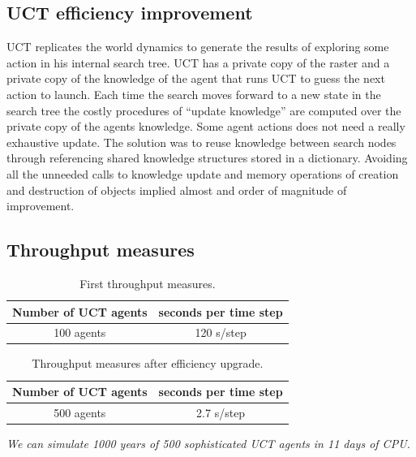 \documentclass[11pt,oneside,a4paper,openright]{report}
\begin{document}
\subsection{UCT efficiency improvement}

UCT replicates the world dynamics to generate the results of exploring some action in his internal search tree. UCT has a private copy of the raster and a private copy of the knowledge of the agent that runs UCT to guess the next action to launch.
Each time the search moves forward to a new state in the search tree the costly procedures of ``update knowledge''
are computed over the private copy of the agents knowledge. Some agent actions does not need a really exhaustive update. The solution was to reuse knowledge between search nodes through referencing shared knowledge structures stored
in a dictionary. Avoiding all the unneeded calls to knowledge update and memory operations of creation and destruction
of objects implied almost and order of magnitude of improvement.

 
\subsection{Throughput measures}



\begin{table}[ht!]
	\centering
	\begin{tabular}{|c|c|}
		\hline
		Number of UCT agents	& seconds per time step \\
		\hline
		100 agents		& 120 s/step\\
		\hline
	\end{tabular}
	\caption{First throughput measures.}
	\label{tab:secondsPerTimeStepInitial}
	\end{table}


\begin{table}[ht!]
	\centering
	\begin{tabular}{|c|c|}
		\hline
		Number of UCT agents	& seconds per time step \\
		\hline
		500 agents		& 2.7 s/step\\
		\hline
	\end{tabular}
	\caption{Throughput measures after efficiency upgrade.}
	\label{tab:secondsPerTimeStepImproved}
	\end{table}

	\emph{We can simulate 1000 years of 500 sophisticated UCT agents in 11 days of CPU.}

	
	
\end{document}
